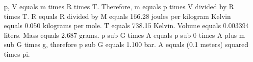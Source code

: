 p, V equals m times R times T. Therefore, m equals p times V divided by R times T. R equals R divided by M equals 166.28 joules per kilogram Kelvin equals 0.050 kilograms per mole. T equals 738.15 Kelvin. Volume equals 0.003394 liters. Mass equals 2.687 grams. p sub G times A equals p sub 0 times A plus m sub G times g, therefore p sub G equals 1.100 bar. A equals (0.1 meters) squared times pi.